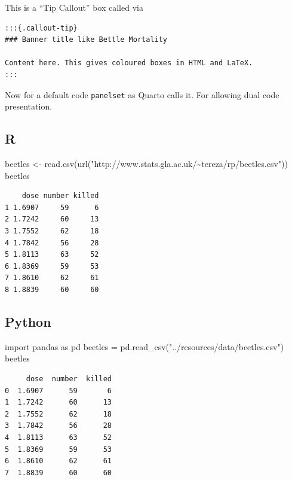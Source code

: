 \documentclass[
  a4paper,
  DIV=11,
  numbers=noendperiod,
  oneside]{scrreport}
\newenvironment{Shaded}{\begin{snugshade}}{\end{snugshade}}
\newcommand{\FunctionTok}[1]{\textcolor[rgb]{0.28,0.35,0.67}{#1}}
\newcommand{\ImportTok}[1]{\textcolor[rgb]{0.00,0.46,0.62}{#1}}
\newcommand{\NormalTok}[1]{\textcolor[rgb]{0.00,0.23,0.31}{#1}}
\newcommand{\OperatorTok}[1]{\textcolor[rgb]{0.37,0.37,0.37}{#1}}
\newcommand{\OtherTok}[1]{\textcolor[rgb]{0.00,0.23,0.31}{#1}}
\newcommand{\StringTok}[1]{\textcolor[rgb]{0.13,0.47,0.30}{#1}}
\begin{document}
\begin{tcolorbox}[enhanced jigsaw, toprule=.15mm, toptitle=1mm, rightrule=.15mm, bottomtitle=1mm, arc=.35mm, opacitybacktitle=0.6, opacityback=0, title=\textcolor{quarto-callout-tip-color}{\faLightbulb}\hspace{0.5em}{Beetle mortality}, coltitle=black, bottomrule=.15mm, breakable, colbacktitle=quarto-callout-tip-color!10!white, colframe=quarto-callout-tip-color-frame, titlerule=0mm, leftrule=.75mm, left=2mm, colback=white]

This is a ``Tip Callout'' box called via

\begin{verbatim}
:::{.callout-tip}
### Banner title like Bettle Mortality

Content here. This gives coloured boxes in HTML and LaTeX.
:::
\end{verbatim}

Now for a default code \texttt{panelset} as Quarto calls it. For
allowing dual code presentation.

\subsection{R}

\begin{Shaded}
\begin{Highlighting}[]
\NormalTok{beetles }\OtherTok{\textless{}{-}} \FunctionTok{read.csv}\NormalTok{(}\FunctionTok{url}\NormalTok{(}\StringTok{"http://www.stats.gla.ac.uk/\textasciitilde{}tereza/rp/beetles.csv"}\NormalTok{))}
\NormalTok{beetles}
\end{Highlighting}
\end{Shaded}

\begin{verbatim}
    dose number killed
1 1.6907     59      6
2 1.7242     60     13
3 1.7552     62     18
4 1.7842     56     28
5 1.8113     63     52
6 1.8369     59     53
7 1.8610     62     61
8 1.8839     60     60
\end{verbatim}

\subsection{Python}

\begin{Shaded}
\begin{Highlighting}[]
\ImportTok{import}\NormalTok{ pandas }\ImportTok{as}\NormalTok{ pd}
\NormalTok{beetles }\OperatorTok{=}\NormalTok{ pd.read\_csv(}\StringTok{"../resources/data/beetles.csv"}\NormalTok{)}
\NormalTok{beetles}
\end{Highlighting}
\end{Shaded}

\begin{verbatim}
     dose  number  killed
0  1.6907      59       6
1  1.7242      60      13
2  1.7552      62      18
3  1.7842      56      28
4  1.8113      63      52
5  1.8369      59      53
6  1.8610      62      61
7  1.8839      60      60
\end{verbatim}

\end{tcolorbox}
\end{document}
